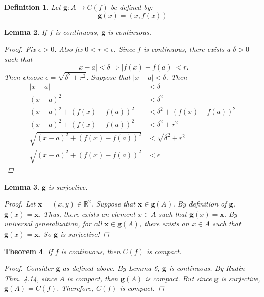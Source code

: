 \documentclass{amsart}
\newtheorem{theorem}{Theorem}
\newtheorem{lemma}[theorem]{Lemma}
\newtheorem{definition}[theorem]{Definition}
\begin{document}
\begin{enumerate}[1.]
    \begin{definition}
        Let $\mathbf{g}: A \to C(f)$ be defined by:
        \[
            \mathbf{g}(x) = (x, f(x))    
        \]
    \end{definition}
    \begin{lemma}
        If $f$ is continuous, $\mathbf{g}$ is continuous.
        \begin{proof}
            Fix $\epsilon > 0$. Also fix $0 < r < \epsilon$. Since $f$ is continuous, there exists a $\delta > 0$ such that 
            \[
                |x - a| < \delta \Rightarrow |f(x) - f(a)| < r.    
            \] 
            Then choose $\epsilon = \sqrt{\delta^2 + r^2}$. Suppose that $|x - a| < \delta$. Then
            \begin{align*}
                |x - a| &< \delta \\
                (x - a)^2 &< \delta^2 \\
                (x - a)^2 + (f(x) - f(a))^2 &< \delta^2 + (f(x) - f(a))^2\\
                (x - a)^2 + (f(x) - f(a))^2 &< \delta^2 + r^2\\
                \sqrt{(x - a)^2 + (f(x) - f(a))^2} &< \sqrt{\delta^2 + r^2} \\
                \sqrt{(x - a)^2 + (f(x) - f(a))^2} &< \epsilon
            \end{align*}
        \end{proof}
    \end{lemma}

    \begin{lemma}
        $\mathbf{g}$ is surjective.
        \begin{proof}
            Let $\mathbf{x} = (x, y) \in \mathbb{R}^2$. Suppose that $\mathbf{x} \in \mathbf{g}(A)$. By definition of $\mathbf{g}$, 
            $\mathbf{g}(x) = \mathbf{x}$. Thus, there exists an element $x \in A$ such that $\mathbf{g}(x) = \mathbf{x}$. By universal generalization, 
            for all $\mathbf{x} \in \mathbf{g}(A)$, there exists an $x \in A$ such that $\mathbf{g}(x) = \mathbf{x}$. So $\mathbf{g}$ is surjective!
        \end{proof}
    \end{lemma}

    \begin{theorem}
        If $f$ is continuous, then $C(f)$ is compact.
        \begin{proof}
            Consider $\mathbf{g}$ as defined above. By Lemma 6, $\mathbf{g}$ is continuous.
            By Rudin Thm. 4.14, since $A$ is compact, then $\mathbf{g}(A)$ is compact. But since
            $\mathbf{g}$ is surjective, $\mathbf{g}(A) = C(f)$. Therefore, $C(f)$ is compact.
        \end{proof}
    \end{theorem}
    

\end{enumerate}
\end{document}
